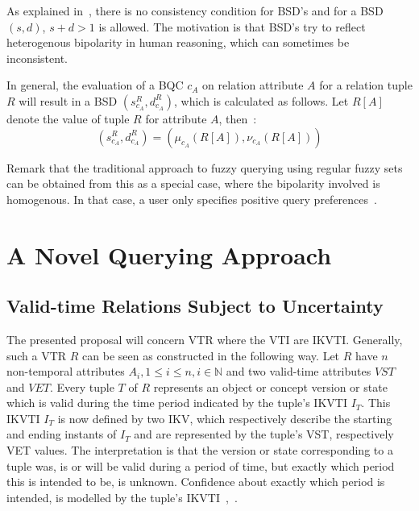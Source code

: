 \documentclass[runningheads,a4paper]{llncs}
\begin{document}
As explained in~\cite{Matthe2011ijis}, there is no consistency condition for BSD's and for a BSD $(s, d)$, $s+d>1$ is allowed. The motivation is that BSD's try to reflect heterogenous bipolarity in human reasoning, which can sometimes be inconsistent.

In general, the evaluation of a BQC $c_{A}$ on relation attribute $A$ for a relation tuple $R$ will result in a BSD $(s_{c_A}^R, d_{c_A}^R)$, which is calculated as follows. Let $R[A]$ denote the value of tuple $R$ for attribute $A$, then~\cite{Matthe2011ijis}:
\begin{equation}\label{eq:bsdeval}
(s_{c_A}^R, d_{c_A}^R)=(\mu_{c_A}(R[A]), \nu_{c_A}(R[A]))
\end{equation}

Remark that the traditional approach to fuzzy querying using regular fuzzy sets can be obtained from this as a special case, where the bipolarity involved is homogenous. In that case, a user only specifies positive query preferences~\cite{Matthe2011ijis}.


\section{A Novel Querying Approach\label{sec:proposal}}

\subsection{Valid-time Relations Subject to Uncertainty}
The presented proposal will concern VTR where the VTI are IKVTI. Generally, such a VTR $R$ can be seen as constructed in the following way. Let $R$ have $n$ non-temporal attributes $A_{i}, 1 \leq i \leq n, i \in \mathbb{N}$ and two valid-time attributes $VST$ and $VET$. Every tuple $T$ of $R$ represents an object or concept version or state which is valid during the time period indicated by the tuple's IKVTI $I_T$. This IKVTI $I_T$ is now defined by two IKV, which respectively describe the starting and ending instants of $I_T$ and are represented by the tuple's VST, respectively VET values. The interpretation is that the version or state corresponding to a tuple was, is or will be valid during a period of time, but exactly which period this is intended to be, is unknown. Confidence about exactly which period is intended, is modelled by the tuple's IKVTI~\cite{Pons2012ijcis},~\cite{Pons2012ipmu}.
\end{document}
